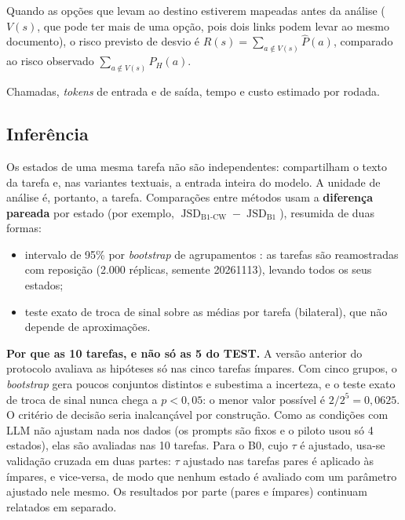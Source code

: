 \documentclass[12pt]{article}
\newcommand{\Ph}{P_H}
\newcommand{\Pp}{\hat{P}}
\DeclareMathOperator{\JSD}{JSD}
\begin{document}
\begin{description}[leftmargin=0.4cm,style=nextline]
\item[Risco de desvio (planejado).] Quando as opções que levam ao destino estiverem mapeadas antes da análise ($V(s)$, que pode ter mais de uma opção, pois dois links podem levar ao mesmo documento), o risco previsto de desvio é $R(s)=\sum_{a\notin V(s)} \Pp(a)$, comparado ao risco observado $\sum_{a\notin V(s)} \Ph(a)$.
\item[Custo.] Chamadas, \textit{tokens} de entrada e de saída, tempo e custo estimado por rodada.
\end{description}

\subsection{Inferência}
\label{sec:inferencia}

Os estados de uma mesma tarefa não são independentes: compartilham o texto da tarefa e, nas variantes textuais, a entrada inteira do modelo. A unidade de análise é, portanto, a tarefa. Comparações entre métodos usam a \textbf{diferença pareada} por estado (por exemplo, $\JSD_{\text{B1-CW}} - \JSD_{\text{B1}}$), resumida de duas formas:
\begin{itemize}[leftmargin=*,itemsep=0pt]
\item intervalo de 95\% por \textit{bootstrap} de agrupamentos \cite{efron1993bootstrap}: as tarefas são reamostradas com reposição (2.000 réplicas, semente 20261113), levando todos os seus estados;
\item teste exato de troca de sinal sobre as médias por tarefa (bilateral), que não depende de aproximações.
\end{itemize}

\textbf{Por que as 10 tarefas, e não só as 5 do TEST.} A versão anterior do protocolo avaliava as hipóteses só nas cinco tarefas ímpares. Com cinco grupos, o \textit{bootstrap} gera poucos conjuntos distintos e subestima a incerteza, e o teste exato de troca de sinal nunca chega a $p<0{,}05$: o menor valor possível é $2/2^5 = 0{,}0625$. O critério de decisão seria inalcançável por construção. Como as condições com LLM não ajustam nada nos dados (os prompts são fixos e o piloto usou só 4 estados), elas são avaliadas nas 10 tarefas. Para o B0, cujo $\tau$ é ajustado, usa-se validação cruzada em duas partes: $\tau$ ajustado nas tarefas pares é aplicado às ímpares, e vice-versa, de modo que nenhum estado é avaliado com um parâmetro ajustado nele mesmo. Os resultados por parte (pares e ímpares) continuam relatados em separado.
\end{document}
